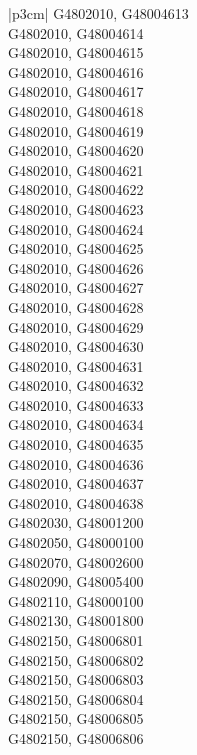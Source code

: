 \begin{customLongTable}{ |p{3cm}| }
G4802010, G48004613 \\ \hline
G4802010, G48004614 \\ \hline
G4802010, G48004615 \\ \hline
G4802010, G48004616 \\ \hline
G4802010, G48004617 \\ \hline
G4802010, G48004618 \\ \hline
G4802010, G48004619 \\ \hline
G4802010, G48004620 \\ \hline
G4802010, G48004621 \\ \hline
G4802010, G48004622 \\ \hline
G4802010, G48004623 \\ \hline
G4802010, G48004624 \\ \hline
G4802010, G48004625 \\ \hline
G4802010, G48004626 \\ \hline
G4802010, G48004627 \\ \hline
G4802010, G48004628 \\ \hline
G4802010, G48004629 \\ \hline
G4802010, G48004630 \\ \hline
G4802010, G48004631 \\ \hline
G4802010, G48004632 \\ \hline
G4802010, G48004633 \\ \hline
G4802010, G48004634 \\ \hline
G4802010, G48004635 \\ \hline
G4802010, G48004636 \\ \hline
G4802010, G48004637 \\ \hline
G4802010, G48004638 \\ \hline
G4802030, G48001200 \\ \hline
G4802050, G48000100 \\ \hline
G4802070, G48002600 \\ \hline
G4802090, G48005400 \\ \hline
G4802110, G48000100 \\ \hline
G4802130, G48001800 \\ \hline
G4802150, G48006801 \\ \hline
G4802150, G48006802 \\ \hline
G4802150, G48006803 \\ \hline
G4802150, G48006804 \\ \hline
G4802150, G48006805 \\ \hline
G4802150, G48006806 \\ \hline

\end{customLongTable}
